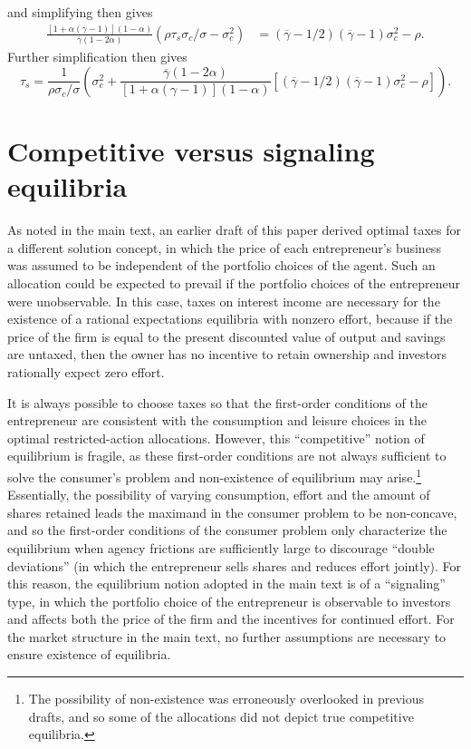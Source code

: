 \documentclass[11pt]{article}
\theoremstyle{plain}
\begin{document}
and simplifying then gives
\begin{align*}
\frac{[1 + \alpha(\gamma-1)](1-\alpha)}{\overline{\gamma}(1 - 2\alpha)}{\left(\rho \tau_s \sigma_c/\sigma - \sigma_c^2\right)} & = (\overline{\gamma}-1/2) (\overline{\gamma}-1) \sigma_c^2 - \rho.
\end{align*}
Further simplification then gives 
\begin{equation}
\tau_s = \frac{1}{\rho\sigma_c/\sigma}{\left(\sigma_c^2 +
\frac{\overline{\gamma}(1 - 2\alpha)}{[1 + \alpha(\gamma-1)](1-\alpha)}  {\left[(\overline{\gamma}-1/2) (\overline{\gamma}-1) \sigma_c^2 - \rho\right]}\right)}.
\label{tax_expression}
\end{equation} %




\section{Competitive versus signaling equilibria} \label{eqcompare}

As noted in the main text, an earlier draft of this paper derived optimal taxes for a different solution concept, in which the price of each entrepreneur's business was assumed to be independent of the portfolio choices of the agent. Such an allocation could be expected to prevail if the portfolio choices of the entrepreneur were unobservable. In this case, taxes on interest income are necessary for the existence of a rational expectations equilibria with nonzero effort, because if the price of the firm is equal to the present discounted value of output and savings are untaxed, then the owner has no incentive to retain ownership and investors rationally expect zero effort.

It is always possible to choose taxes so that the first-order conditions of the entrepreneur are consistent with the consumption and leisure choices in the optimal restricted-action allocations. However, this ``competitive'' notion of equilibrium is fragile, as these first-order conditions are not always sufficient to solve the consumer's problem and non-existence of equilibrium may arise.\footnote{The possibility of non-existence was erroneously overlooked in previous drafts, and so some of the allocations did not depict true competitive equilibria.} Essentially, the possibility of varying consumption, effort and the amount of shares retained leads the maximand in the consumer problem to be non-concave, and so the first-order conditions of the consumer problem only characterize the equilibrium when agency frictions are sufficiently large to discourage ``double deviations'' (in which the entrepreneur sells shares and reduces effort jointly). For this reason, the equilibrium notion adopted in the main text is of a ``signaling'' type, in which the portfolio choice of the entrepreneur is observable to investors and affects both the price of the firm and the incentives for continued effort. For the market structure in the main text, no further assumptions are necessary to ensure existence of equilibria. 
\end{document}
